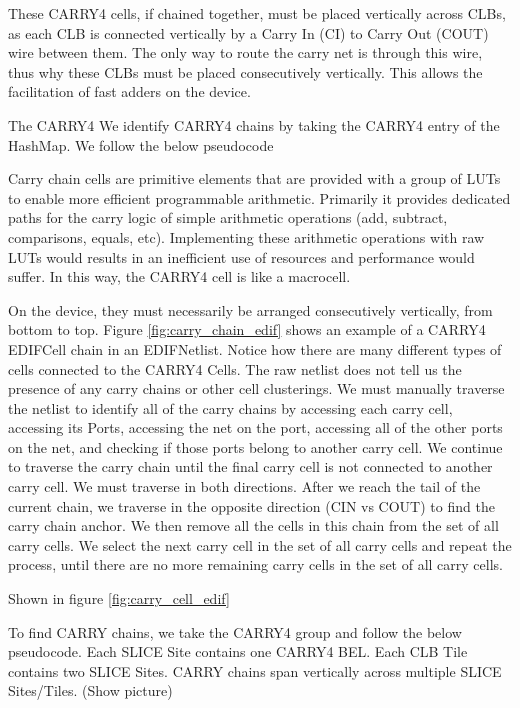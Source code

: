 \documentclass{article}
\begin{document}
\begin{multicols}{2}
            These CARRY4 cells, if chained together, must be placed vertically across CLBs, as each CLB is connected vertically by a Carry In (CI) to Carry Out (COUT) wire between them. 
            The only way to route the carry net is through this wire, thus why these CLBs must be placed consecutively vertically. 
            This allows the facilitation of fast adders on the device. 

            The CARRY4 
            We identify CARRY4 chains by taking the CARRY4 entry of the HashMap. 
            We follow the below pseudocode 




            Carry chain cells are primitive elements that are provided with a group of LUTs to enable more efficient programmable arithmetic. 
            Primarily it provides dedicated paths for the carry logic of simple arithmetic operations (add, subtract, comparisons, equals, etc). Implementing these arithmetic operations with raw LUTs would results in an inefficient use of resources and performance would suffer. 
            In this way, the CARRY4 cell is like a macrocell. 

            On the device, they must necessarily be arranged consecutively vertically, from bottom to top. 
            Figure \ref{fig:carry_chain_edif} shows an example of a CARRY4 EDIFCell chain in an EDIFNetlist. 
            Notice how there are many different types of cells connected to the CARRY4 Cells. 
            The raw netlist does not tell us the presence of any carry chains or other cell clusterings. 
            We must manually traverse the netlist to identify all of the carry chains by accessing each carry cell, accessing its Ports, accessing the net on the port, accessing all of the other ports on the net, and checking if those ports belong to another carry cell. 
            We continue to traverse the carry chain until the final carry cell is not connected to another carry cell. 
            We must traverse in both directions. 
            After we reach the tail of the current chain, we traverse in the opposite direction (CIN vs COUT) to find the carry chain anchor. 
            We then remove all the cells in this chain from the set of all carry cells. 
            We select the next carry cell in the set of all carry cells and repeat the process, until there are no more remaining carry cells in the set of all carry cells. 


            Shown in figure \ref{fig:carry_cell_edif} 

            To find CARRY chains, we take the CARRY4 group and follow the below pseudocode. 
            Each SLICE Site contains one CARRY4 BEL. 
            Each CLB Tile contains two SLICE Sites. 
            CARRY chains span vertically across multiple SLICE Sites/Tiles. (Show picture) 



\end{multicols}
\end{document}
